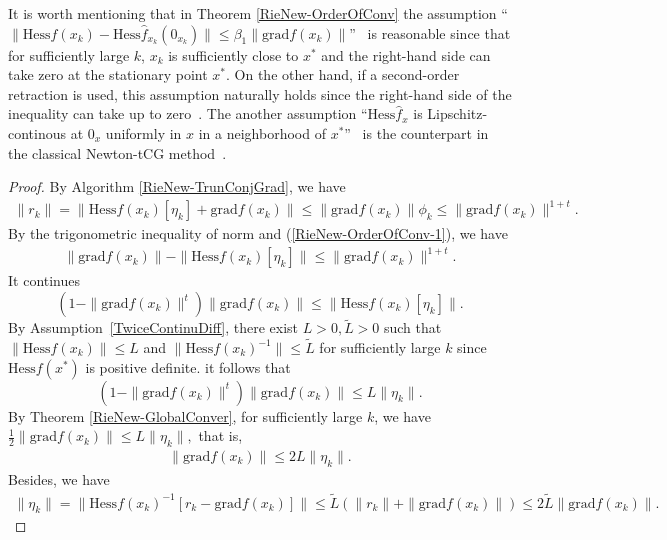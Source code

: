 \documentclass[11pt]{article}
\numberwithin{equation}{section}
\begin{document}
It is worth mentioning that in Theorem \ref{RieNew-OrderOfConv} the assumption ``$\|\mathrm{Hess}f(x_k) - \mathrm{Hess}\hat{f}_{x_k}(0_{x_k})\|\le \beta_1\|\mathrm{grad}f(x_k)\|$''~\cite[Theorem~7.4.10]{AbsMahSep2008} is reasonable since that for sufficiently large $k$, $x_k$ is sufficiently close to $x^*$ and the right-hand side can take zero at the stationary point $x^*$. On the other hand, if a second-order retraction is used, this assumption naturally holds since the right-hand side of the inequality can take up to zero~\cite[Proposition~5.5.5]{AbsMahSep2008}. The another assumption ``$\mathrm{Hess}\hat{f}_x$ is Lipschitz-continous at $0_x$ uniformly in $x$ in a neighborhood of $x^*$''~\cite[Theorem~7.4.10]{AbsMahSep2008} is the counterpart in the classical Newton-tCG method~\cite{DES82}.

\begin{proof}
	By Algorithm \ref{RieNew-TrunConjGrad}, we have 
    \begin{align}
      \|r_k\|=\|\mathrm{Hess}f(x_k)[\eta_k]+\mathrm{grad}f(x_k)\|\le \|\mathrm{grad}f(x_k)\|\phi_k\le\|\mathrm{grad}f(x_k)\|^{1+t}. \label{RieNew-OrderOfConv-1}
    \end{align}
    By the trigonometric inequality of norm and (\ref{RieNew-OrderOfConv-1}), we have  
    \begin{align*}
      \|\mathrm{grad}f(x_k)\|-\|\mathrm{Hess}f(x_k)[\eta_k]\|\le\|\mathrm{grad}f(x_k)\|^{1+t}.
    \end{align*}
    It continues 
    \[
      (1-\|\mathrm{grad}f(x_k)\|^t)\|\mathrm{grad}f(x_k)\|\le\|\mathrm{Hess}f(x_k)[\eta_k]\|.
      \]
    By Assumption~\ref{TwiceContinuDiff}, there exist $L > 0,\tilde{L}>0$ such that $\|\mathrm{Hess}f(x_k)\|\le L$ and $\|\mathrm{Hess}f(x_k)^{-1}\|\le \tilde{L}$ for sufficiently large $k$ since $\mathrm{Hess}f(x^*)$ is positive definite. it follows that
    \[
      (1-\|\mathrm{grad}f(x_k)\|^t)\|\mathrm{grad}f(x_k)\|\le L\|\eta_k\|.
      \]
    By Theorem \ref{RieNew-GlobalConver}, for sufficiently large $k$, we have 
    $
      \frac{1}{2}\|\mathrm{grad}f(x_k)\|\le L\|\eta_k\|,
	$
    that is, 
    \begin{align}
      \|\mathrm{grad}f(x_k)\|\le 2L\|\eta_k\|. \label{RieNew-OrderOfConv-2}
    \end{align}
    Besides, we have 
    \begin{align}
      \|\eta_k\|=\|\mathrm{Hess}f(x_k)^{-1}[r_k-\mathrm{grad}f(x_k)]\|\le\tilde{L}(\|r_k\|+\|\mathrm{grad}f(x_k)\|)\le 2\tilde{L}\|\mathrm{grad}f(x_k)\|.  \label{RieNew-OrderOfConv-3}

\end{align}
\end{proof}
\end{document}
